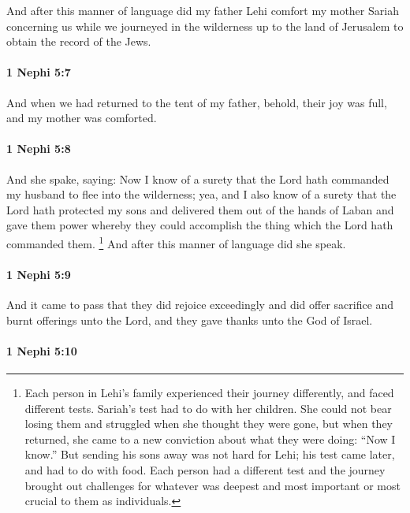 			And after this manner of language
			did my father Lehi comfort my mother Sariah concerning us
			while we journeyed in the wilderness up to the land of Jerusalem
			to obtain the record of the Jews.

		\paragraph{1 Nephi 5:7} %
			\label{1NEPHI-5-7}

			And when we had returned to the tent of my father,
			behold, their joy was full, and my mother was comforted.

		\paragraph{1 Nephi 5:8} %
			\label{1NEPHI-5-8}

			And she spake, saying:
			Now I know of a surety that the Lord hath commanded
			my husband to flee into the wilderness;
			yea, and I also know of a surety
			that the Lord hath protected my sons
			and delivered them out of the hands of Laban
			and gave them power whereby they could accomplish the thing
			which the Lord hath commanded them.%
				\footnote{%
					\label{1NEPHI-5-8-NOTE-sariah}%
					Each person in Lehi's family experienced their journey differently, and faced different tests. Sariah's test had to do with her children. She could not bear losing them and struggled when she thought they were gone, but when they returned, she came to a new conviction about what they were doing: ``Now I know.'' But sending his sons away was not hard for Lehi; his test came later, and had to do with food. Each person had a different test and the journey brought out challenges for whatever was deepest and most important or most crucial to them as individuals.
					}
			And after this manner of language did she speak.

		\paragraph{1 Nephi 5:9} %
			\label{1NEPHI-5-9}

			And it came to pass that they did rejoice exceedingly
			and did offer sacrifice and burnt offerings unto the Lord,
			and they gave thanks unto the God of Israel.

		\paragraph{1 Nephi 5:10} %
			\label{1NEPHI-5-10}


